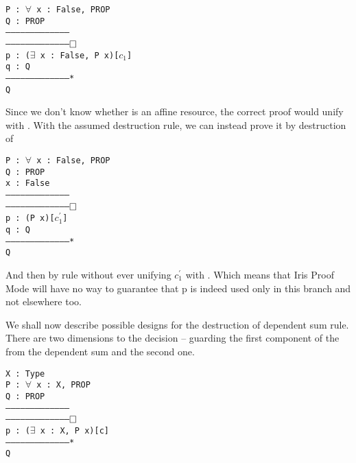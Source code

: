 \begin{minipage}{\linewidth}
\texttt{P : $\forall$ x : False, PROP\\
Q : PROP\\
---------------------------------------\\
---------------------------------------$\mathop{\Box}$\\
p : ($\exists$ x : False, P x)[$c_1$]\\
q : Q\\
---------------------------------------*\\
Q
}
\end{minipage}

Since we don't know whether  is an affine resource, the correct proof would unify  with \false.
With the assumed destruction rule, we can instead prove it by destruction of \\

\begin{minipage}{\linewidth}
\texttt{P : $\forall$ x : False, PROP\\
Q : PROP\\
x : False\\
---------------------------------------\\
---------------------------------------$\mathop{\Box}$\\
p : (P x)[$c^{'}_1$]\\
q : Q\\
---------------------------------------*\\
Q
}
\end{minipage}
And then by  rule without ever unifying $c^{'}_1$ with \true.
Which means that Iris Proof Mode will have no way to guarantee that p is indeed used only in this branch and not elsewhere too.

We shall now describe possible designs for the destruction of dependent sum rule.
There are two dimensions to the decision -- guarding the first component of the from the dependent sum and the second one.

\begin{minipage}{\linewidth}
\texttt{X : Type\\
P : $\forall$ x : X, PROP\\
Q : PROP\\
---------------------------------------\\
---------------------------------------$\mathop{\Box}$\\
p : ($\exists$ x : X, P x)[c]\\
---------------------------------------*\\
Q
}
\end{minipage}

